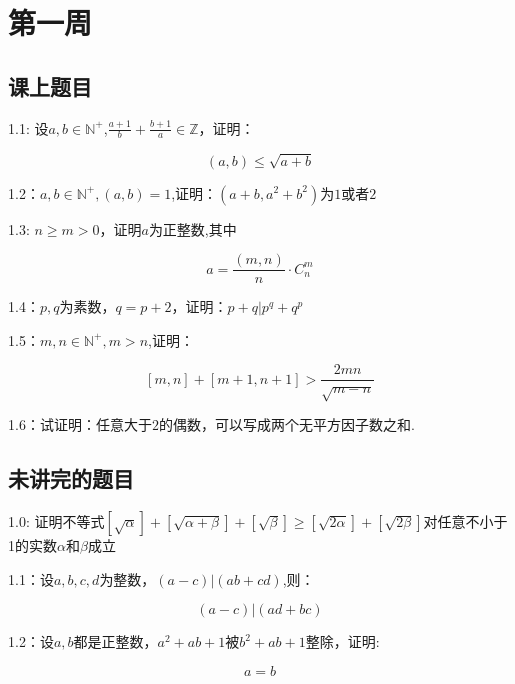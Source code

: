 \documentclass{ctexart}
\title{\LARGE\heiti {华罗庚协会讨论班题目}}
\author{华仔 }
\date{}
\begin{document}
\maketitle

\section{第一周}

\subsection{课上题目}

1.1: 设$a,b\in\mathbb{N}^{+}$,$\frac{a+1}{b}+\frac{b+1}{a}\in \mathbb{Z}$，证明：
	
\[
(a,b)\le\sqrt{a+b}
\]

1.2：$a,b\in \mathbb{N}^{+},(a,b)=1$,证明：$(a+b,a^2+b^2)$为$1$或者$2$

    
1.3: $n\ge m>0$，证明$a$为正整数,其中

\[a=\frac{(m,n)}{n}·C_{n}^{m}
    \]

1.4：$p,q$为素数，$q=p+2$，证明：$p+q|p^q+q^p$
	

1.5：$m,n\in \mathbb{N}^{+},m>n$,证明：

\[
\left[m,n\right]+\left[m+1,n+1\right]>\frac{2mn}{\sqrt{m-n}}
      \]

1.6：试证明：任意大于$2$的偶数，可以写成两个无平方因子数之和.



\subsection{未讲完的题目}
1.0: 证明不等式$[\sqrt{\alpha}]+[\sqrt{\alpha+\beta}]+[\sqrt{\beta}]\ge [\sqrt{2 \alpha}]+[\sqrt{2\beta}]$对任意不小于1的实数$\alpha$和$\beta$成立

1.1：设$a,b,c,d$为整数，$(a-c)|(ab+cd)$,则：

	\[
	(a-c)|(ad+bc)
	\]

1.2：设$a,b$都是正整数，$a^2+ab+1$被$b^2+ab+1$整除，证明:

	\[
	a=b
	\]
\end{document}
